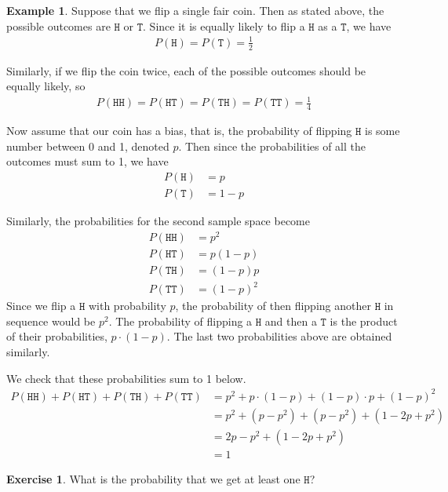 \documentclass[11pt,letterpaper]{article}
\newcommand\hd{\texttt{H}}
\newcommand\tl{\texttt{T}}
\numberwithin{theorem}{section}
\numberwithin{definition}{section}
\numberwithin{lemma}{section}
\numberwithin{corollary}{section}
\numberwithin{proposition}{section}
\theoremstyle{definition}
\numberwithin{remark}{section}
\numberwithin{claim}{section}
\numberwithin{observation}{section}
\numberwithin{fact}{section}
\numberwithin{assumption}{section}
\newtheorem{example}[theorem]{Example}
\numberwithin{example}{section}
\newtheorem{exercise}[theorem]{Exercise}
\numberwithin{exercise}{section}
\begin{document}
\begin{example}
Suppose that we flip a single fair coin. Then as stated above, the possible outcomes are $\hd$ or $\tl$. Since it is equally likely to flip a $\hd$ as a $\tl$, we have
\begin{align*}
P(\hd) = P(\tl) = \frac{1}{2}
\end{align*}

Similarly, if we flip the coin twice, each of the possible outcomes should be equally likely, so
\begin{align*}
P(\hd \hd) = P(\hd \tl) = P(\tl \hd) = P(\tl \tl) = \frac{1}{4}
\end{align*}

Now assume that our coin has a bias, that is, the probability of flipping $\hd$ is some number between 0 and 1, denoted $p$. Then since the probabilities of all the outcomes must sum to 1, we have
\begin{align*}
P(\hd) &= p \\
P(\tl) &= 1-p
\end{align*}

Similarly, the probabilities for the second sample space become
\begin{align*}
P(\hd \hd) &= p^2 \\
P(\hd \tl) &= p (1-p) \\
P(\tl \hd) &= (1-p) p \\
P(\tl \tl) &= (1-p)^2 
\end{align*}
Since we flip a $\hd$ with probability $p$, the probability of then flipping another $\hd$ in sequence would be $p^2$. The probability of flipping a $\hd$ and then a $\tl$ is the product of their probabilities, $p\cdot (1-p)$. The last two probabilities above are obtained similarly.

We check that these probabilities sum to 1 below.
\begin{align*}
P(\hd \hd) + P(\hd \tl ) + P(\tl \hd) + P(\tl \tl) &= p^2 + p\cdot (1-p) + (1-p) 
\cdot p + (1-p)^2 \\
&= p^2 + (p - p^2) + (p - p^2) + (1 - 2p + p^2) \\
&= 2p - p^2 + (1 - 2p + p^2) \\
&= 1
\end{align*}
\end{example}


\begin{exercise}
What is the probability that we get at least one $\hd$?
\end{exercise}
\end{document}
